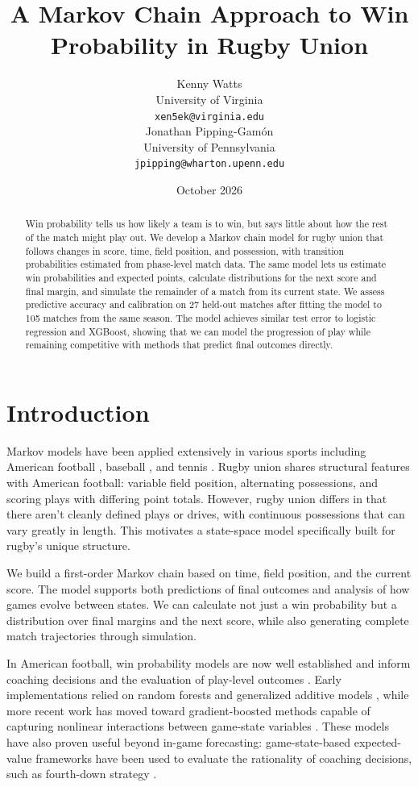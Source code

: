 \documentclass[12pt]{article}
\title{A Markov Chain Approach to Win Probability in Rugby Union}
\author{
  \begin{minipage}[t]{0.45\textwidth}
    \centering
    Kenny Watts \\
    University of Virginia \\
    \texttt{xen5ek@virginia.edu}
  \end{minipage}
  \hfill
  \begin{minipage}[t]{0.45\textwidth}
    \centering
    Jonathan Pipping-Gam\'on \\
    University of Pennsylvania \\
    \texttt{jpipping@wharton.upenn.edu}
  \end{minipage}
}
\date{October 2026}
\begin{document}
\maketitle

\begin{abstract}
Win probability tells us how likely a team is to win, but says little about how the rest of the match might play out. We develop a Markov chain model for rugby union that follows changes in score, time, field position, and possession, with transition probabilities estimated from phase-level match data. The same model lets us estimate win probabilities and expected points, calculate distributions for the next score and final margin, and simulate the remainder of a match from its current state. We assess predictive accuracy and calibration on 27 held-out matches after fitting the model to 105 matches from the same season. The model achieves similar test error to logistic regression and XGBoost, showing that we can model the progression of play while remaining competitive with methods that predict final outcomes directly.
\end{abstract}

\section{Introduction}

Markov models have been applied extensively in various sports including American football \citep{Goldner2012}, baseball \citep{Bukiet1997AMC}, and tennis \citep{newton2009monte}. Rugby union shares structural features with American football: variable field position, alternating possessions, and scoring plays with differing point totals. However, rugby union differs in that there aren't cleanly defined plays or drives, with continuous possessions that can vary greatly in length. This motivates a state-space model specifically built for rugby's unique structure.

We build a first-order Markov chain based on time, field position, and the current score.
The model supports both predictions of final outcomes and analysis of how games evolve between states.
We can calculate not just a win probability but a distribution over final margins and the next score, while also generating complete match trajectories through simulation.


In American football, win probability models are now well established and inform coaching decisions and the evaluation of play-level outcomes \citep{LockNettleton2014, YurkoVenturaHorowitz2019}. Early implementations relied on random forests and generalized additive models \citep{LockNettleton2014, YurkoVenturaHorowitz2019}, while more recent work has moved toward gradient-boosted methods capable of capturing nonlinear interactions between game-state variables \citep{Baldwin2021}. These models have also proven useful beyond in-game forecasting: game-state-based expected-value frameworks have been used to evaluate the rationality of coaching decisions, such as fourth-down strategy \citep{Romer2006}. 
\end{document}
